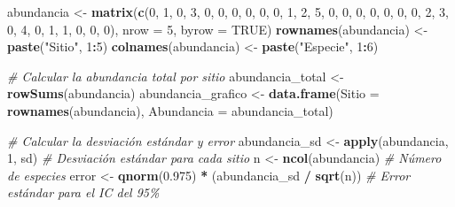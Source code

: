 \documentclass[
]{article}
\newenvironment{Shaded}{\begin{snugshade}}{\end{snugshade}}
\newcommand{\AttributeTok}[1]{\textcolor[rgb]{0.13,0.29,0.53}{#1}}
\newcommand{\CommentTok}[1]{\textcolor[rgb]{0.56,0.35,0.01}{\textit{#1}}}
\newcommand{\ConstantTok}[1]{\textcolor[rgb]{0.56,0.35,0.01}{#1}}
\newcommand{\DecValTok}[1]{\textcolor[rgb]{0.00,0.00,0.81}{#1}}
\newcommand{\FloatTok}[1]{\textcolor[rgb]{0.00,0.00,0.81}{#1}}
\newcommand{\FunctionTok}[1]{\textcolor[rgb]{0.13,0.29,0.53}{\textbf{#1}}}
\newcommand{\NormalTok}[1]{#1}
\newcommand{\OtherTok}[1]{\textcolor[rgb]{0.56,0.35,0.01}{#1}}
\newcommand{\SpecialCharTok}[1]{\textcolor[rgb]{0.81,0.36,0.00}{\textbf{#1}}}
\newcommand{\StringTok}[1]{\textcolor[rgb]{0.31,0.60,0.02}{#1}}
\begin{document}
\begin{Shaded}
\begin{Highlighting}[]
\NormalTok{abundancia }\OtherTok{\textless{}{-}} \FunctionTok{matrix}\NormalTok{(}\FunctionTok{c}\NormalTok{(}\DecValTok{0}\NormalTok{, }\DecValTok{1}\NormalTok{, }\DecValTok{0}\NormalTok{, }\DecValTok{3}\NormalTok{, }\DecValTok{0}\NormalTok{, }\DecValTok{0}\NormalTok{,}
                       \DecValTok{0}\NormalTok{, }\DecValTok{0}\NormalTok{, }\DecValTok{0}\NormalTok{, }\DecValTok{0}\NormalTok{, }\DecValTok{1}\NormalTok{, }\DecValTok{2}\NormalTok{,}
                       \DecValTok{5}\NormalTok{, }\DecValTok{0}\NormalTok{, }\DecValTok{0}\NormalTok{, }\DecValTok{0}\NormalTok{, }\DecValTok{0}\NormalTok{, }\DecValTok{0}\NormalTok{,}
                       \DecValTok{0}\NormalTok{, }\DecValTok{0}\NormalTok{, }\DecValTok{2}\NormalTok{, }\DecValTok{3}\NormalTok{, }\DecValTok{0}\NormalTok{, }\DecValTok{4}\NormalTok{,}
                       \DecValTok{0}\NormalTok{, }\DecValTok{1}\NormalTok{, }\DecValTok{1}\NormalTok{, }\DecValTok{0}\NormalTok{, }\DecValTok{0}\NormalTok{, }\DecValTok{0}\NormalTok{), }
                     \AttributeTok{nrow =} \DecValTok{5}\NormalTok{, }\AttributeTok{byrow =} \ConstantTok{TRUE}\NormalTok{)}
\FunctionTok{rownames}\NormalTok{(abundancia) }\OtherTok{\textless{}{-}} \FunctionTok{paste}\NormalTok{(}\StringTok{"Sitio"}\NormalTok{, }\DecValTok{1}\SpecialCharTok{:}\DecValTok{5}\NormalTok{)}
\FunctionTok{colnames}\NormalTok{(abundancia) }\OtherTok{\textless{}{-}} \FunctionTok{paste}\NormalTok{(}\StringTok{"Especie"}\NormalTok{, }\DecValTok{1}\SpecialCharTok{:}\DecValTok{6}\NormalTok{)}

\CommentTok{\# Calcular la abundancia total por sitio}
\NormalTok{abundancia\_total }\OtherTok{\textless{}{-}} \FunctionTok{rowSums}\NormalTok{(abundancia)}
\NormalTok{abundancia\_grafico }\OtherTok{\textless{}{-}} \FunctionTok{data.frame}\NormalTok{(}\AttributeTok{Sitio =} \FunctionTok{rownames}\NormalTok{(abundancia), }\AttributeTok{Abundancia =}\NormalTok{ abundancia\_total)}

\CommentTok{\# Calcular la desviación estándar y error}
\NormalTok{abundancia\_sd }\OtherTok{\textless{}{-}} \FunctionTok{apply}\NormalTok{(abundancia, }\DecValTok{1}\NormalTok{, sd)  }\CommentTok{\# Desviación estándar para cada sitio}
\NormalTok{n }\OtherTok{\textless{}{-}} \FunctionTok{ncol}\NormalTok{(abundancia)  }\CommentTok{\# Número de especies}
\NormalTok{error }\OtherTok{\textless{}{-}} \FunctionTok{qnorm}\NormalTok{(}\FloatTok{0.975}\NormalTok{) }\SpecialCharTok{*}\NormalTok{ (abundancia\_sd }\SpecialCharTok{/} \FunctionTok{sqrt}\NormalTok{(n))  }\CommentTok{\# Error estándar para el IC del 95\%}
\end{Highlighting}
\end{Shaded}
\end{document}
